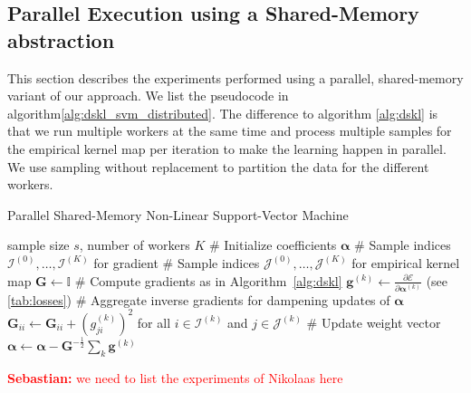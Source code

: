 \documentclass{article} %
\newcommand{\va}{\boldsymbol{\alpha}}
\renewcommand{\vec}[1]{\mathbf{#1}}
\newcommand{\sebastian}[1]{\textcolor{red}{{\bf Sebastian:} #1}}
\begin{document}
 \subsection{Parallel Execution using a Shared-Memory abstraction}\label{sec:distributed}
This section describes the experiments performed using a parallel, shared-memory variant of our approach. We list the pseudocode in algorithm\autoref{alg:dskl_svm_distributed}. The difference to algorithm \autoref{alg:dskl} is that we run multiple workers at the same time and process multiple samples for the empirical kernel map per iteration to make the learning happen in parallel. We use sampling without replacement to partition the data for the different workers. 

 \begin{algorithm}
   \begin{algorithmic}[1]
     \caption{Parallel Shared-Memory Non-Linear Support-Vector Machine\label{alg:dskl_svm_distributed}}
       \REQUIRE sample size $s$, number of workers $K$
       \STATE \# Initialize coefficients $\va$
       \STATE \# Sample indices $\mathcal{I}^{(0)},\dots,\mathcal{I}^{(K)}$ for gradient 
       \STATE \# Sample indices $\mathcal{J}^{(0)},\dots,\mathcal{J}^{(K)}$ for empirical kernel map 
       \STATE $\vec{G} \leftarrow \mathbb{I}$
             \STATE \# Compute gradients as in Algorithm~\autoref{alg:dskl}
             \STATE $\vec{g}^{(k)} \gets \frac{\partial \mathcal{E}}{\partial\va^{(k)}}$ (see \autoref{tab:losses})
             \STATE \# Aggregate inverse gradients for dampening updates of $\va$
             \STATE $\vec{G}_{ii} \leftarrow \vec{G}_{ii} + \left(g^{(k)}_{ji}\right)^2$ for all $i \in\mathcal{I}^{(k)}$ and $j\in\mathcal{J}^{(k)}$
           \ENDFOR
         \ENDFOR
         \STATE \# Update weight vector 
         \STATE $\va \leftarrow \va - \vec{G}^{-\frac{1}{2}} \sum_k \vec{g}^{(k)}$
       \ENDWHILE
   \end{algorithmic}
 \end{algorithm}

\sebastian{we need to list the experiments of Nikolaas here}
\end{document}
